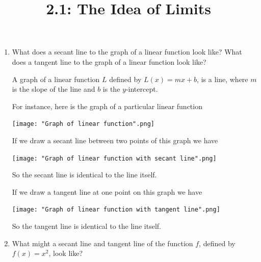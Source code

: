 \documentclass[nooutcomes,handout]{ximera}
\title{2.1:  The Idea of Limits}
\begin{document}
\begin{abstract}		\end{abstract}
\maketitle


 \begin{problem} \hfil

	\begin{enumerate}

		\item What does a secant line to the graph of a  linear function look like?  What does a tangent line to the graph of a linear function look like? 

 \begin{freeResponse}		 
	
	A graph of a linear function $L$ defined by $L(x) = mx + b$, is a line, where $m$ is the slope of the line and $b$ is the $y$-intercept.
      
        For instance, here is the graph of a particular linear function
        \begin{image}
          \texttt{[image: "Graph of linear function".png]}
        \end{image}

        If we draw a secant line between two points of this graph we have
        \begin{image}
          \texttt{[image: "Graph of linear function with secant line".png]}
        \end{image}
        So the secant line is identical to the line itself.

        If we draw a tangent line at one point on this graph we have
        \begin{image}
          \texttt{[image: "Graph of linear function with tangent line".png]}
        \end{image}
        So the tangent line is identical to the line itself.
\end{freeResponse}


		\item  What might a secant line and tangent line of the function $f$, defined by $f(x) = x^2$, look like?


\end{enumerate}
\end{problem}
\end{document}
